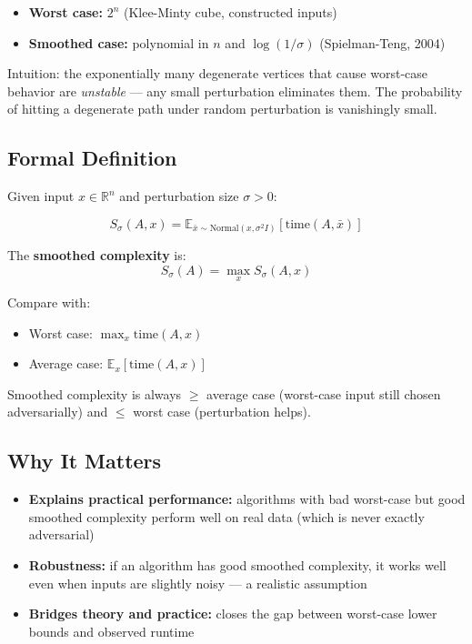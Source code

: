 \begin{itemize}
\item \textbf{Worst case:} $2^{n}$ (Klee-Minty cube, constructed inputs)
\item \textbf{Smoothed case:} polynomial in $n$ and $\log(1/\sigma)$ (Spielman-Teng, 2004)
\end{itemize}

Intuition: the exponentially many degenerate vertices that cause worst-case behavior are \textit{unstable} — any small perturbation eliminates them. The probability of hitting a degenerate path under random perturbation is vanishingly small.

\subsection{Formal Definition}

Given input $x \in \mathbb{R}^n$ and perturbation size $\sigma > 0$:

\[
S_\sigma(A, x) = \mathbb{E}_{\bar{x} \sim \text{Normal}(x, \sigma^2 I)}[\text{time}(A, \bar{x})]
\]

The \textbf{smoothed complexity} is:
\[
S_\sigma(A) = \max_x S_\sigma(A, x)
\]

Compare with:
\begin{itemize}
\item Worst case: $\max_x \text{time}(A, x)$
\item Average case: $\mathbb{E}_{x}[\text{time}(A, x)]$
\end{itemize}

Smoothed complexity is always $\ge$ average case (worst-case input still chosen adversarially) and $\le$ worst case (perturbation helps).

\subsection{Why It Matters}

\begin{itemize}
\item \textbf{Explains practical performance:} algorithms with bad worst-case but good smoothed complexity perform well on real data (which is never exactly adversarial)
\item \textbf{Robustness:} if an algorithm has good smoothed complexity, it works well even when inputs are slightly noisy — a realistic assumption
\item \textbf{Bridges theory and practice:} closes the gap between worst-case lower bounds and observed runtime
\end{itemize}

